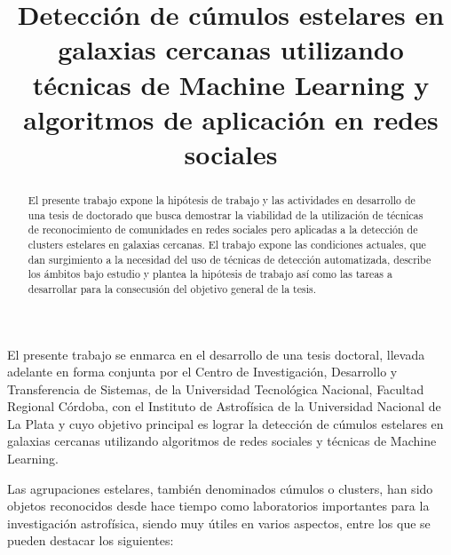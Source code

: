 \documentclass[
	11pt,oneside,a4paper
]{article}
\title{Detección de cúmulos estelares en galaxias cercanas utilizando técnicas de Machine Learning y algoritmos de aplicación en redes sociales}
\date{}
\begin{document}
\maketitle
\pagestyle{empty} %

\begin{abstract}
	El presente trabajo expone la hipótesis de trabajo y las actividades en desarrollo de una tesis de doctorado que busca demostrar la viabilidad de la utilización de técnicas de reconocimiento de comunidades en redes sociales pero aplicadas a la detección de clusters estelares en galaxias cercanas. El trabajo expone las condiciones actuales, que dan surgimiento a la necesidad del uso de técnicas de detección automatizada, describe los ámbitos bajo estudio y plantea la hipótesis de trabajo así como las tareas a desarrollar para la consecusión del objetivo general de la tesis.
\end{abstract}

%

\ifdefined\borrador
	\listoftodos
\fi 





El presente trabajo se enmarca en el desarrollo de una tesis doctoral, llevada adelante en forma conjunta por el Centro de Investigación, Desarrollo y Transferencia de Sistemas, de la Universidad Tecnológica Nacional, Facultad Regional Córdoba, con el Instituto de Astrofísica de la Universidad Nacional de La Plata y cuyo objetivo principal es lograr la detección de cúmulos estelares en galaxias cercanas utilizando algoritmos de redes sociales y técnicas de Machine Learning. 

Las agrupaciones estelares, también denominados cúmulos o clusters, han sido objetos reconocidos desde hace tiempo como laboratorios importantes para la investigación astrofísica, siendo muy útiles en varios aspectos, entre los que se pueden destacar los siguientes:
\end{document}
